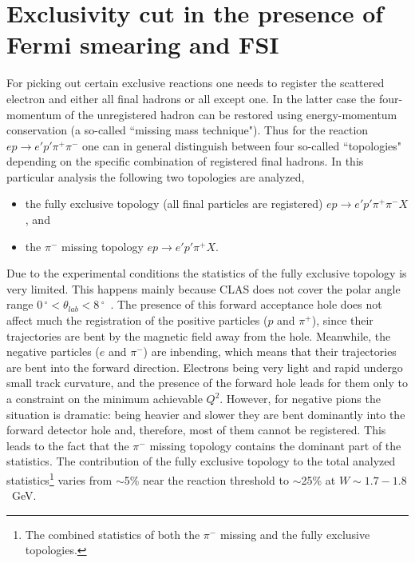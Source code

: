 


\newpage
\section{Exclusivity cut in the presence of Fermi smearing and FSI}
\label{Sect:excl_cut}

For picking out certain exclusive reactions one needs to register the scattered electron and either all final hadrons or all except one. In the latter case the four-momentum of the unregistered hadron can be restored using energy-momentum conservation (a so-called ``missing mass technique"). Thus for the reaction $e p \rightarrow e' p' \pi^{+} \pi^{-} $ one can in general distinguish between four so-called ``topologies" depending on the specific combination of registered final hadrons. In this particular analysis the following two topologies are analyzed,%
\begin{itemize}
\item the fully exclusive topology (all final particles are registered) $e p \rightarrow e' p' \pi^{+} \pi^{-} X$, and%
\item the $\pi^{-}$ missing topology $e p \rightarrow e' p' \pi^{+} X$.
\end{itemize} %


Due to the experimental conditions the statistics of the fully exclusive topology is very limited. This happens mainly because CLAS does not cover the polar angle range $0\,^{\circ}\mathrm{} < \theta_{lab} < 8\,^{\circ}\mathrm{}$~\cite{Mecking:2003zu}. The presence of this forward acceptance
hole does not affect much the registration of the positive particles ($p$ and $\pi^{+}$), since their trajectories are bent by the magnetic field away from the hole. Meanwhile, the negative particles ($e$ and $\pi^{-}$) are inbending, which means that their trajectories are bent into the forward direction. Electrons being very light and rapid undergo small track curvature, and the presence of the forward hole leads for them only to a constraint on the minimum achievable $Q^2$. However, for negative pions the situation is dramatic: being heavier and slower they are bent dominantly into the forward detector hole and, therefore, most of them cannot be registered. This leads to the fact that the $\pi^{-}$ missing topology contains the dominant part of the statistics. The contribution of the fully exclusive topology to the total analyzed statistics\footnote[8]{The combined statistics of both the $\pi^{-}$ missing and the fully exclusive topologies.} varies from $\sim$5\% near the reaction threshold to $\sim$25\% at $W\sim 1.7-1.8$~GeV. 
 
